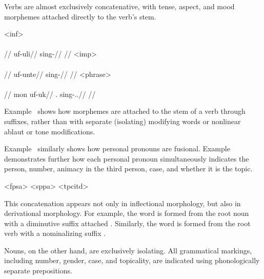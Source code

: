 Verbs are almost exclusively concatenative, with tense, aspect, and mood morphemes attached directly to the verb's stem.

	\a<inf>\begingl
		\glpreamble{}\\
		\\
		//
		\gla uf-uli//
		\glb sing-\Inf//
		\glft{}//
	\endgl
	\a<imp>\begingl
		\glpreamble{}\\
		\\
		//
		\gla uf-unte//
		\glb sing-\Imp//
		\glft{}//
	\endgl
	\a<phrase>\begingl
		\glpreamble{}\\
		\\
		//
		\gla mon uf-uk//
		\glb \Fps.\Top{} sing-\Ind.\Pst.\Pfv//
	\glft{}//
	\endgl
\xe

Example~ shows how morphemes are attached to the stem of a verb through suffixes, rather than with separate (isolating) modifying words or nonlinear ablaut or tone modifications.

Example~ similarly shows how personal pronouns are fusional. Example~ demonstrates further how each personal pronoun simultaneously indicates the person, number, animacy in the third person, case, and whether it is the topic.

	\a<fpsa>     
	\a<sppa>     
	\a<tpcitd>     
\xe

This concatenation appears not only in inflectional morphology, but also in derivational morphology. For example, the word     is formed from the root noun     with a diminutive suffix attached . Similarly, the word     is formed from the root verb     with a nominalizing suffix .

Nouns, on the other hand, are exclusively isolating. All grammatical markings, including number, gender, case, and topicality, are indicated using phonologically separate prepositions.

